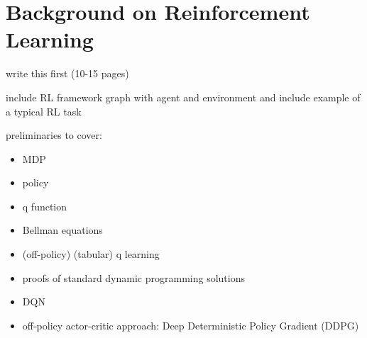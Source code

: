 \section{Background on Reinforcement Learning}

\begin{notes}
    write this first (10-15 pages)

    include RL framework graph with agent and environment and include example of a typical RL task

    preliminaries to cover:

    \begin{itemize}
        \item MDP
        \item policy
        \item q function
        \item Bellman equations
        \item (off-policy) (tabular) q learning
        \item proofs of standard dynamic programming solutions
        \item DQN
        \item off-policy actor-critic approach: Deep Deterministic Policy Gradient (DDPG)
    \end{itemize}
\end{notes}